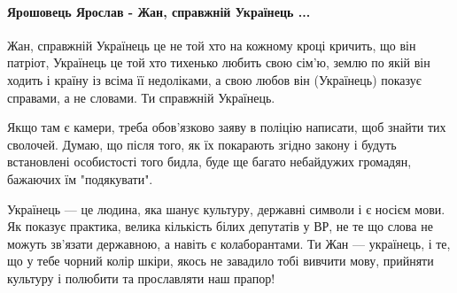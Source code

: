  
 
 
 
 
\paragraph{Ярошовець Ярослав - Жан, справжній Українець ...}
\label{sec:13_08_2021.fb.belenjuk_zhan.1.napadenie.cmt.jaroshovec_ukrainec}

\begin{itemize}
 

Жан, справжній Українець це не той хто на кожному кроці кричить, що він
патріот, Українець це той хто тихенько любить свою сім'ю, землю по якій він
ходить і країну із всіма її недоліками, а свою любов він (Українець) показує
справами, а не словами. Ти справжній Українець.


 

Якщо там є камери, треба обов'язково заяву в поліцію написати, щоб знайти тих
сволочей. Думаю, що після того, як їх покарають згідно закону і будуть
встановлені особистості того бидла, буде ще багато небайдужих громадян,
бажаючих їм "подякувати".


 

Українець — це людина, яка шанує культуру, державні символи і є носієм мови. Як
показує практика, велика кількість білих депутатів у ВР, не те що слова не
можуть зв’язати державною, а навіть є колаборантами. Ти Жан — українець, і те,
що у тебе чорний колір шкіри, якось не завадило тобі вивчити мову, прийняти
культуру і полюбити та прославляти наш прапор!


\end{itemize}
